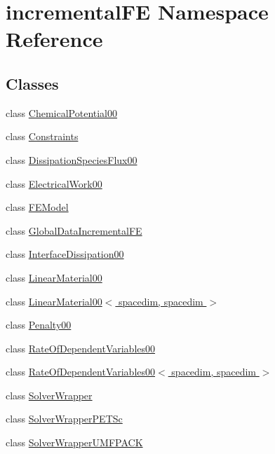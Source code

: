 \hypertarget{namespaceincremental_f_e}{}\section{incremental\+FE Namespace Reference}
\label{namespaceincremental_f_e}
\subsection*{Classes}
\begin{DoxyCompactItemize}
\item 
class \hyperlink{classincremental_f_e_1_1_chemical_potential00}{Chemical\+Potential00}
\item 
class \hyperlink{classincremental_f_e_1_1_constraints}{Constraints}
\item 
class \hyperlink{classincremental_f_e_1_1_dissipation_species_flux00}{Dissipation\+Species\+Flux00}
\item 
class \hyperlink{classincremental_f_e_1_1_electrical_work00}{Electrical\+Work00}
\item 
class \hyperlink{classincremental_f_e_1_1_f_e_model}{F\+E\+Model}
\item 
class \hyperlink{classincremental_f_e_1_1_global_data_incremental_f_e}{Global\+Data\+Incremental\+FE}
\item 
class \hyperlink{classincremental_f_e_1_1_interface_dissipation00}{Interface\+Dissipation00}
\item 
class \hyperlink{classincremental_f_e_1_1_linear_material00}{Linear\+Material00}
\item 
class \hyperlink{classincremental_f_e_1_1_linear_material00_3_01spacedim_00_01spacedim_01_4}{Linear\+Material00$<$ spacedim, spacedim $>$}
\item 
class \hyperlink{classincremental_f_e_1_1_penalty00}{Penalty00}
\item 
class \hyperlink{classincremental_f_e_1_1_rate_of_dependent_variables00}{Rate\+Of\+Dependent\+Variables00}
\item 
class \hyperlink{classincremental_f_e_1_1_rate_of_dependent_variables00_3_01spacedim_00_01spacedim_01_4}{Rate\+Of\+Dependent\+Variables00$<$ spacedim, spacedim $>$}
\item 
class \hyperlink{classincremental_f_e_1_1_solver_wrapper}{Solver\+Wrapper}
\item 
class \hyperlink{classincremental_f_e_1_1_solver_wrapper_p_e_t_sc}{Solver\+Wrapper\+P\+E\+T\+Sc}
\item 
class \hyperlink{classincremental_f_e_1_1_solver_wrapper_u_m_f_p_a_c_k}{Solver\+Wrapper\+U\+M\+F\+P\+A\+CK}
\end{DoxyCompactItemize}
